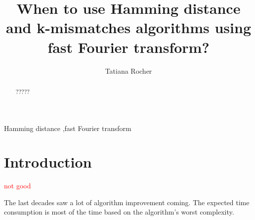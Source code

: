\documentclass[preprint,12pt]{elsarticle}
\begin{document}
\begin{frontmatter}


\title{When to use Hamming distance and k-mismatches algorithms using fast Fourier transform?}




\author{Tatiana Rocher}

\address{University of Bristol, UK}

\begin{abstract}
?????
\end{abstract}

\begin{keyword}
Hamming distance \sep fast Fourier transform


\end{keyword}

\end{frontmatter}

\linenumbers

\section*{Introduction}
\label{S:1}

\textcolor{red}{not good}

The last decades saw a lot of algorithm improvement coming.
The expected time consumption is most of the time based on the algorithm's worst complexity.
\end{document}
